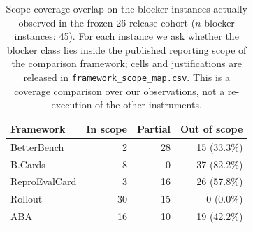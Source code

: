 \begin{table}[t]
\centering
\caption{Scope-coverage overlap on the blocker instances actually
observed in the frozen 26-release cohort ($n$ blocker instances:
45). For each instance we ask whether the blocker class lies
inside the published reporting scope of the comparison framework;
cells and justifications are released in
\texttt{framework\_scope\_map.csv}. This is a coverage comparison over
our observations, not a re-execution of the other instruments.}
\label{tab:overlap}
\begin{tabular}{lrrr}
\toprule
Framework & In scope & Partial & Out of scope \\
\midrule
BetterBench & 2 & 28 & 15 (33.3\%) \\
B.Cards & 8 & 0 & 37 (82.2\%) \\
ReproEvalCard & 3 & 16 & 26 (57.8\%) \\
Rollout & 30 & 15 & 0 (0.0\%) \\
ABA & 16 & 10 & 19 (42.2\%) \\
\bottomrule
\end{tabular}
\end{table}
